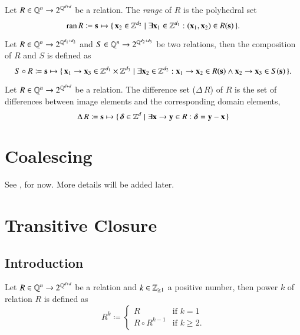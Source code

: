\begin{definition}
Let $R \in \mathbb{Q}^n \to 2^{\mathbb{Q}^{d+d}}$ be a relation.
The {\em range} of $R$ is the polyhedral set
$$
\range R \coloneqq \vec s \mapsto
\{\, \vec x_2 \in \Z^{d_2} \mid \exists \vec x_1 \in \Z^{d_1} :
(\vec x_1, \vec x_2) \in R(\vec s) \,\}
.
$$
\end{definition}

\begin{definition}
Let $R \in \mathbb{Q}^n \to 2^{\mathbb{Q}^{d_1+d_2}}$ and
$S \in \mathbb{Q}^n \to 2^{\mathbb{Q}^{d_2+d_3}}$ be two relations,
then the composition of
$R$ and $S$ is defined as
$$
S \circ R \coloneqq
\vec s \mapsto
\{\, \vec x_1 \to \vec x_3 \in \Z^{d_1} \times \Z^{d_3}
\mid \exists \vec x_2 \in \Z^{d_2} :
\vec x_1 \to \vec x_2 \in R(\vec s) \wedge
\vec x_2 \to \vec x_3 \in S(\vec s)
\,\}
.
$$
\end{definition}

\begin{definition}
Let $R \in \mathbb{Q}^n \to 2^{\mathbb{Q}^{d+d}}$ be a relation.
The difference set ($\Delta \, R$) of $R$ is the set
of differences between image elements and the corresponding
domain elements,
$$
\Delta \, R \coloneqq
\vec s \mapsto
\{\, \vec \delta \in \Z^{d} \mid \exists \vec x \to \vec y \in R :
\vec \delta = \vec y - \vec x
\,\}
$$
\end{definition}

\section{Coalescing}\label{s:coalescing}

See , for now.
More details will be added later.

\section{Transitive Closure}

\subsection{Introduction}

\begin{definition}
Let $R \in \mathbb{Q}^n \to 2^{\mathbb{Q}^{d+d}}$ be a relation and
$k \in \mathbb{Z}_{\ge 1}$
a positive number, then power $k$ of relation $R$ is defined as
\begin{equation}
\label{eq:transitive:power}
R^k \coloneqq
\begin{cases}
R & \text{if $k = 1$}
\\
R \circ R^{k-1} & \text{if $k \ge 2$}
.
\end{cases}
\end{equation}
\end{definition}

